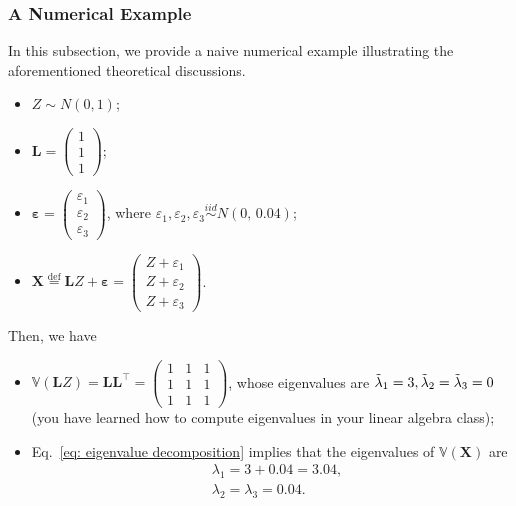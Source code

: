 \documentclass[11pt,letterpaper, leqno]{article}
\numberwithin{equation}{section}
\numberwithin{theorem}{section}
\numberwithin{lemma}{section}
\numberwithin{corollary}{section}
\numberwithin{definition}{section}
\numberwithin{proposition}{section}
\numberwithin{remark}{section}
\numberwithin{example}{section}
\newcommand{\T}{\intercal}
\begin{document}
\subsubsection{A Numerical Example}

In this subsection, we provide a naive numerical example illustrating the aforementioned theoretical discussions.
\begin{itemize}
    \item $Z\sim N(0,1)$;
    \item $\boldsymbol{L}=\begin{pmatrix}
        1 \\
        1 \\
        1
    \end{pmatrix}$;
    \item $\boldsymbol{\varepsilon}=\begin{pmatrix}
        \varepsilon_1 \\
        \varepsilon_2 \\
        \varepsilon_3
    \end{pmatrix}$, where $\varepsilon_1, \varepsilon_2, \varepsilon_3\overset{iid}{\sim} N(0, \, 0.04)$;
    \item $\boldsymbol{X} \overset{\operatorname{def}}{=} \boldsymbol{L}Z+\boldsymbol{\varepsilon}=\begin{pmatrix}
        Z + \varepsilon_1 \\
        Z + \varepsilon_2\\
        Z + \varepsilon_3
    \end{pmatrix}$.
\end{itemize}
Then, we have
\begin{itemize}
    \item $\mathbb{V}(\boldsymbol{L}Z)= \boldsymbol{LL}^\T=\begin{pmatrix}
        1 & 1 & 1 \\
        1 & 1 & 1 \\
        1 & 1 & 1 
    \end{pmatrix}$, whose eigenvalues are $\Tilde{\lambda}_1=3, \Tilde{\lambda}_2=\Tilde{\lambda}_3=0$ (you have learned how to compute eigenvalues in your linear algebra class);
    \item Eq.~\eqref{eq: eigenvalue decomposition} implies that the eigenvalues of $\mathbb{V}(\boldsymbol{X})$ are 
    \begin{align*}
        &\lambda_1=3+0.04=3.04, \\
        &\lambda_2=\lambda_3=0.04.
    \end{align*}
\end{itemize}
\end{document}
